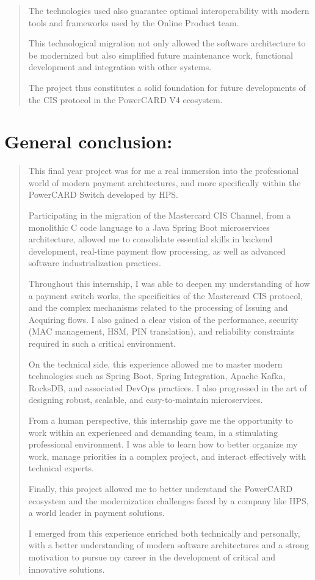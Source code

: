 \documentclass[12pt,a4paper]{report}
\begin{document}
\begin{quote}
The technologies used also guarantee optimal interoperability with
modern tools and frameworks used by the Online Product team.

This technological migration not only allowed the software architecture
to be modernized but also simplified future maintenance work, functional
development and integration with other systems.

The project thus constitutes a solid foundation for future developments
of the CIS protocol in the PowerCARD V4 ecosystem.
\end{quote}

\clearpage

\section{General conclusion:}

\begin{quote}
This final year project was for me a real immersion into the
professional world of modern payment architectures, and more
specifically within the PowerCARD Switch developed by HPS.

Participating in the migration of the Mastercard CIS Channel, from a
monolithic C code language to a Java Spring Boot microservices
architecture, allowed me to consolidate essential skills in backend
development, real-time payment flow processing, as well as advanced
software industrialization practices.

Throughout this internship, I was able to deepen my understanding of how
a payment switch works, the specificities of the Mastercard CIS
protocol, and the complex mechanisms related to the processing of
Issuing and Acquiring flows. I also gained a clear vision of the
performance, security (MAC management, HSM, PIN translation), and
reliability constraints required in such a critical environment.

On the technical side, this experience allowed me to master modern
technologies such as Spring Boot, Spring Integration, Apache Kafka,
RocksDB, and associated DevOps practices. I also progressed in the art
of designing robust, scalable, and easy-to-maintain microservices.

From a human perspective, this internship gave me the opportunity to
work within an experienced and demanding team, in a stimulating
professional environment. I was able to learn how to better organize my
work, manage priorities in a complex project, and interact effectively
with technical experts.

Finally, this project allowed me to better understand the PowerCARD
ecosystem and the modernization challenges faced by a company like HPS,
a world leader in payment solutions.

I emerged from this experience enriched both technically and personally,
with a better understanding of modern software architectures and a
strong motivation to pursue my career in the development of critical and
innovative solutions.
\end{quote}
\clearpage
\end{document}
